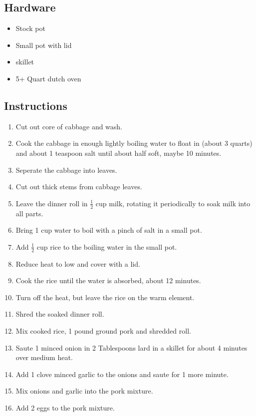 \begin{multicols}{2}
\subsection*{Hardware}
\begin{itemize}
    \item Stock pot
    \item Small pot with lid
    \item skillet
    \item 5+ Quart dutch oven
\end{itemize}
\clearpage

\subsection*{Instructions}
\begin{enumerate}
    \item Cut out core of cabbage and wash.
    \item Cook the cabbage in enough lightly boiling water to float in (about 3 quarts) and about 1 teaspoon salt until about half soft, maybe 10 minutes.
    \item Seperate the cabbage into leaves.
    \item Cut out thick stems from cabbage leaves.
    \item Leave the dinner roll in \( \frac{1}{2} \) cup milk, rotating it periodically to soak milk into all parts.
    \item Bring 1 cup water to boil with a pinch of salt in a small pot.
    \item Add \( \frac{1}{2} \) cup rice to the boiling water in the small pot.
    \item Reduce heat to low and cover with a lid.
    \item Cook the rice until the water is absorbed, about 12 minutes.
    \item Turn off the heat, but leave the rice on the warm element.
    \item Shred the soaked dinner roll.
    \item Mix cooked rice, 1 pound ground pork and shredded roll.
    \item Saute 1 minced onion in 2 Tablespoons lard in a skillet for about 4 minutes over medium heat.
    \item Add 1 clove minced garlic to the onions and saute for 1 more minute.
    \item Mix onions and garlic into the pork mixture.
    \item Add 2 eggs to the pork mixture.

\end{enumerate}
\end{multicols}
